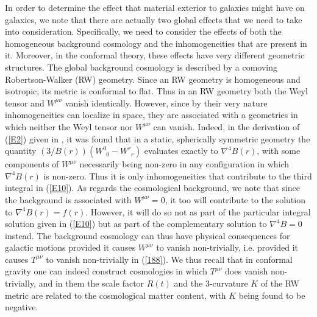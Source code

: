 \documentclass[preprint,aps]{revtex4}
\begin{document}
In order to determine the effect that material exterior to galaxies might have on galaxies, we note that there are actually two global effects that we need to take into consideration. Specifically, we need to consider the effects of both the homogeneous background cosmology and the inhomogeneities that are present in it. Moreover, in the conformal theory, these effects have very different geometric structures. The global background cosmology is described by a comoving Robertson-Walker (RW) geometry. Since an RW geometry is homogeneous and isotropic, its metric is conformal to flat. Thus in an RW geometry both the Weyl tensor and $W^{\mu\nu}$ vanish identically. However, since by their very nature inhomogeneities can localize in space, they are associated with a geometries in which neither the Weyl tensor nor $W^{\mu\nu}$ can vanish. Indeed, in the derivation of (\ref{E2}) given in \cite{Mannheim1994}, it was found that in a static, spherically symmetric geometry the quantity $(3/B(r))\left(W^0_{{\phantom 0} 0} - W^r_{{\phantom r} r}\right)$ evaluates exactly to $\nabla^4B(r)$, with some components of $W^{\mu\nu}$ necessarily being non-zero in any configuration in which $\nabla^4B(r)$ is non-zero. Thus it is only inhomogeneities that contribute to the third integral in (\ref{E10}). As regards the cosmological background, we note that since the background is associated with $W^{\mu\nu}=0$, it too will contribute to the solution to $\nabla^4 B(r)=f(r)$. However, it will do so not as part of the particular integral solution given in (\ref{E10}) but as part of the complementary solution to $\nabla^4B=0$ instead. The background cosmology can thus have physical consequences for galactic motions provided it causes $W^{\mu\nu}$ to vanish non-trivially, i.e. provided it causes $T^{\mu\nu}$  to vanish non-trivially in (\ref{188}). We thus recall \cite{Mannheim1992,Mannheim2006} that in conformal gravity one can indeed construct cosmologies in which $T^{\mu\nu}$  does vanish non-trivially, and in them the scale factor $R(t)$ and the 3-curvature $K$ of the RW metric are related to the cosmological matter content, with $K$ being found \cite{Mannheim2006} to be negative.
\end{document}
